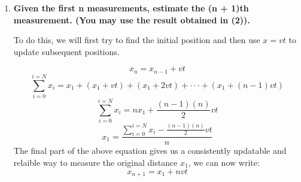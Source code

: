 \documentclass[a4paper, 12pt]{exam}
\newcommand{\tripdot}{\cdot \cdot \cdot}
\begin{document}
\begin{enumerate}
			\pagebreak
			
			\item \textbf{Given the first n measurements, estimate the (n + 1)th measurement. (You may use the result obtained in (2)).}
			
			To do this, we will first try to find the initial position and then use $x=vt$ to update subsequent positions.
			
			\begin{equation}
					x_n = x_{n-1} + vt 
			\end{equation}
			\begin{equation}
				\sum_{i = 0}^{i = N}x_i = x_1 + (x_1 + vt) + (x_1 + 2vt) + \tripdot +	(x_1 + (n-1)vt)
			\end{equation}
			\begin{equation}
				\sum_{i = 0}^{i = N}x_i = nx_1 + \frac{(n-1)(n)}{2}vt
			\end{equation}
			\begin{equation}
				x_1 = \frac{\sum_{i = 0}^{i = N}x_i - \frac{(n-1)(n)}{2}vt}{n}
			\end{equation}
			The final part of the above equation gives us a consistently updatable and relaible way to measure the original distance $x_1$, we can now write:
			\begin{equation}
				x_{n+1} = x_1 + nvt
			\end{equation}
		\end{enumerate}
\end{document}
